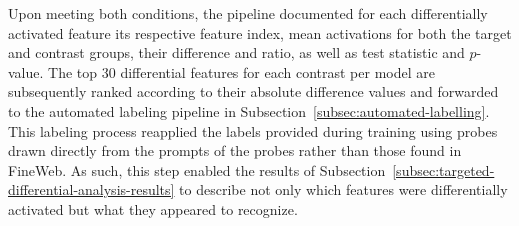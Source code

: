 Upon meeting both conditions, the pipeline documented for each differentially activated feature its respective feature index, mean activations for both the target and contrast groups, their difference and ratio, as well as test statistic and $p$-value. The top 30 differential features for each contrast per model are subsequently ranked according to their absolute difference values and forwarded to the automated labeling pipeline in Subsection~\ref{subsec:automated-labelling}. This labeling process reapplied the labels provided during training using probes drawn directly from the prompts of the probes rather than those found in FineWeb. As such, this step enabled the results of Subsection~\ref{subsec:targeted-differential-analysis-results} to describe not only which features were differentially activated but what they appeared to recognize.
